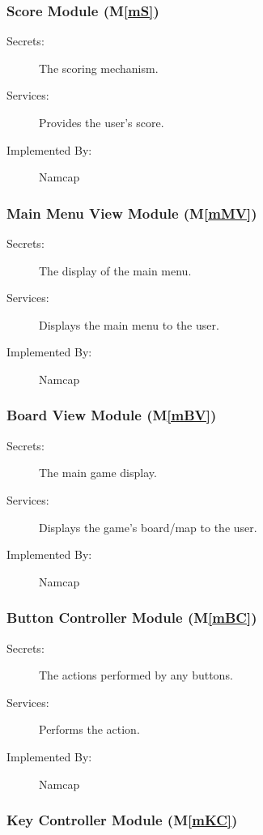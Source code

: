 \documentclass[12pt, titlepage]{article}
\newcommand{\mref}[1]{M\ref{#1}}
\begin{document}
\subsubsection{Score Module (\mref{mS})}

\begin{description}
\item[Secrets:]The scoring mechanism.
\item[Services:]Provides the user's score.
\item[Implemented By:] Namcap
\end{description}

\subsubsection{Main Menu View Module (\mref{mMV})}

\begin{description}
\item[Secrets:]The display of the main menu.
\item[Services:]Displays the main menu to the user.
\item[Implemented By:] Namcap
\end{description}

\subsubsection{Board View Module (\mref{mBV})}

\begin{description}
\item[Secrets:]The main game display.
\item[Services:]Displays the game's board/map to the user.
\item[Implemented By:] Namcap
\end{description}

\subsubsection{Button Controller Module (\mref{mBC})}

\begin{description}
\item[Secrets:]The actions performed by any buttons.
\item[Services:]Performs the action. 
\item[Implemented By:] Namcap
\end{description}

\subsubsection{Key Controller Module (\mref{mKC})}
\end{document}
